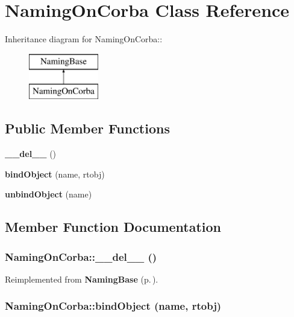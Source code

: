 \section{Naming\-On\-Corba Class Reference}
\label{classNamingOnCorba}
Inheritance diagram for Naming\-On\-Corba::\begin{figure}[H]
\begin{center}
\leavevmode
\includegraphics[height=2cm]{classNamingOnCorba}
\end{center}
\end{figure}
\subsection*{Public Member Functions}
\begin{CompactItemize}
\item 
{\bf \_\-\_\-del\_\-\_\-} ()
\item 
{\bf bind\-Object} (name, rtobj)
\item 
{\bf unbind\-Object} (name)
\end{CompactItemize}


\subsection{Member Function Documentation}
\subsubsection{\setlength{\rightskip}{0pt plus 5cm}Naming\-On\-Corba::\_\-\_\-del\_\-\_\- ()}\label{classNamingOnCorba_NamingOnCorbaa0}




Reimplemented from {\bf Naming\-Base} {\rm (p.\,\pageref{classNamingBase_NamingBasea0})}.
\subsubsection{\setlength{\rightskip}{0pt plus 5cm}Naming\-On\-Corba::bind\-Object (name, rtobj)}\label{classNamingOnCorba_NamingOnCorbaa1}




